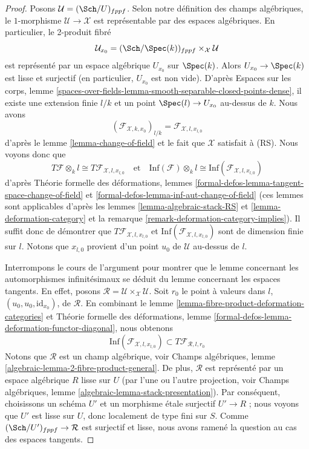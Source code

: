 \begin{proof}
Posons $\mathcal{U} = (\Sch/U)_{fppf}$. Selon notre définition
des champs algébriques, le $1$-morphisme $\mathcal{U} \to \mathcal{X}$
est représentable par des espaces algébriques. En particulier, le
2-produit fibré
$$
\mathcal{U}_{x_0} = (\Sch/\Spec(k))_{fppf} \times_\mathcal{X} \mathcal{U}
$$
est représenté par un espace algébrique $U_{x_0}$ sur $\Spec(k)$. Alors
$U_{x_0} \to \Spec(k)$ est lisse et surjectif (en particulier, $U_{x_0}$
est non vide). D'après Espaces sur les corps, lemme
\ref{spaces-over-fields-lemma-smooth-separable-closed-points-dense},
il existe une extension finie $l/k$ et un point
$\Spec(l) \to U_{x_0}$ au-dessus de $k$. Nous avons
$$
(\mathcal{F}_{\mathcal{X}, k , x_0})_{l/k} =
\mathcal{F}_{\mathcal{X}, l, x_{l, 0}}
$$
d'après le lemme \ref{lemma-change-of-field} et le fait que $\mathcal{X}$
satisfait à (RS). Nous voyons donc que
$$
T\mathcal{F} \otimes_k l \cong T\mathcal{F}_{\mathcal{X}, l, x_{l, 0}}
\quad\text{et}\quad
\text{Inf}(\mathcal{F}) \otimes_k l \cong
\text{Inf}(\mathcal{F}_{\mathcal{X}, l, x_{l, 0}})
$$
d'après
Théorie formelle des déformations, lemmes
\ref{formal-defos-lemma-tangent-space-change-of-field} et
\ref{formal-defos-lemma-inf-aut-change-of-field}
(ces lemmes sont applicables d'après les
lemmes \ref{lemma-algebraic-stack-RS} et
\ref{lemma-deformation-category} et la
remarque \ref{remark-deformation-category-implies}).
Il suffit donc de démontrer que $T\mathcal{F}_{\mathcal{X}, l, x_{l, 0}}$
et $\text{Inf}(\mathcal{F}_{\mathcal{X}, l, x_{l, 0}})$
sont de dimension finie sur $l$. Notons que $x_{l, 0}$ provient d'un point
$u_0$ de $\mathcal{U}$ au-dessus de $l$.

\medskip\noindent
Interrompons le cours de l'argument pour montrer que le lemme concernant les
automorphismes infinitésimaux se déduit du lemme concernant les espaces tangents.
En effet, posons
$\mathcal{R} = \mathcal{U} \times_\mathcal{X} \mathcal{U}$.
Soit $r_0$ le point à valeurs dans $l$, $(u_0, u_0, \text{id}_{x_0})$, de
$\mathcal{R}$. En combinant le
lemme \ref{lemma-fibre-product-deformation-categories} et
Théorie formelle des déformations, lemme
\ref{formal-defos-lemma-deformation-functor-diagonal},
nous obtenons
$$
\text{Inf}(\mathcal{F}_{\mathcal{X}, l, x_{l, 0}})
\subset
T\mathcal{F}_{\mathcal{R}, l, r_0}
$$
Notons que $\mathcal{R}$ est un champ algébrique, voir
Champs algébriques, lemme \ref{algebraic-lemma-2-fibre-product-general}.
De plus, $\mathcal{R}$ est représenté par un espace algébrique $R$
lisse sur $U$ (par l'une ou l'autre projection, voir
Champs algébriques, lemme \ref{algebraic-lemma-stack-presentation}).
Par conséquent, choisissons un schéma $U'$ et un morphisme \'etale surjectif
$U' \to R$ ; nous voyons que $U'$ est lisse sur $U$, donc localement de
type fini sur $S$. Comme $(\Sch/U')_{fppf} \to \mathcal{R}$ est
surjectif et lisse, nous avons ramené la question au cas
des espaces tangents.


\end{proof}
